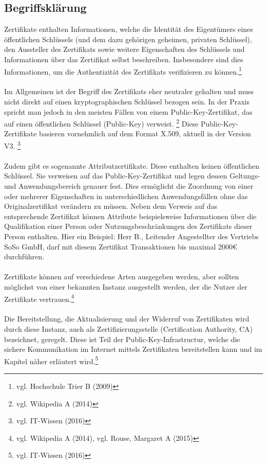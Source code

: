 \subsection{Begriffsklärung}
Zertifikate enthalten Informationen, welche die Identität des Eigentümers eines öffentlichen Schlüssels (und dem dazu gehörigen geheimen, privaten Schlüssel), den Aussteller des Zertifikats sowie weitere Eigenschaften des Schlüssels und Informationen über das Zertifikat selbst beschreiben. Insbesondere sind dies Informationen, um die Authentizität des Zertifikats verifizieren zu können.\footnote{vgl. Hochschule Trier B (2009)}\\
\\
Im Allgemeinen ist der Begriff des Zertifikats eher neutraler gehalten und muss nicht direkt auf einen kryptographischen Schlüssel bezogen sein. In der Praxis spricht man jedoch in den meisten Fällen von einem Public-Key-Zertifikat, das auf einen öffentlichen Schlüssel (Public-Key) verweist. \footnote{vgl. Wikipedia A (2014)} Diese Public-Key-Zertifikate basieren vornehmlich auf dem Format X.509, aktuell in der Version V3. \footnote{vgl. IT-Wissen (2016)}\\
\\
Zudem gibt es sogenannte Attributzertifikate. Diese enthalten keinen öffentlichen Schlüssel. Sie verweisen auf das Public-Key-Zertifikat und legen dessen Geltungs- und Anwendungsbereich genauer fest. Dies ermöglicht die Zuordnung von einer oder mehrerer Eigenschaften in unterschiedlichen Anwendungsfällen ohne das Originalzertifikat verändern zu müssen. Neben dem Verweis auf das entsprechende Zertifikat können Attribute beispielsweise Informationen über die Qualifikation einer Person oder Nutzungsbeschränkungen des Zertifikats dieser Person enthalten. Hier ein Beispiel: Herr B., Leitender Angestellter des Vertriebs SoSo GmbH, darf mit diesem Zertifikat Transaktionen bis maximal 2000\euro{} durchführen.\\ 
\\
Zertifikate können auf verschiedene Arten ausgegeben werden, aber sollten möglichst von einer bekannten Instanz ausgestellt werden, der die Nutzer der Zertifikate vertrauen.\footnote{vgl. Wikipedia A (2014), vgl. Rouse, Margaret A (2015)}\\
\\
Die Bereitstellung, die Aktualisierung und der Widerruf von Zertifikaten wird durch diese Instanz, auch als Zertifizierungsstelle (Certification Authority, CA) bezeichnet, geregelt. Diese ist Teil der Public-Key-Infrastructur, welche die sichere Kommunikation im Internet mittels Zertifikaten bereitstellen kann und im Kapitel \textit{} näher erläutert wird.\footnote{vgl. IT-Wissen (2016)}
